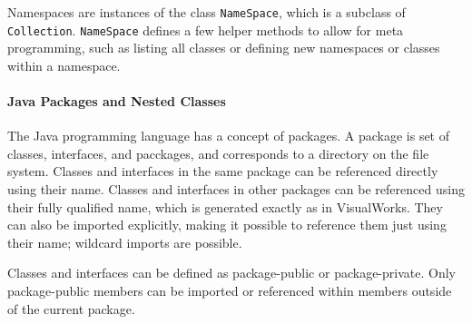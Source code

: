 Namespaces are instances of the class \texttt{NameSpace}, which is a subclass of \texttt{Collection}. \texttt{NameSpace} defines a few helper methods to allow for meta programming, such as listing all classes or defining new namespaces or classes within a namespace.

\paragraph{Java Packages and Nested Classes}
The Java programming language has a concept of packages. A package is set of classes, interfaces, and pacckages, and corresponds to a directory on the file system. Classes and interfaces in the same package can be referenced directly using their name. Classes and interfaces in other packages can be referenced using their fully qualified name, which is generated exactly as in VisualWorks. They can also be imported explicitly, making it possible to reference them just using their name; wildcard imports are possible.

Classes and interfaces can be defined as package-public or package-private. Only package-public members can be imported or referenced within members outside of the current package.

